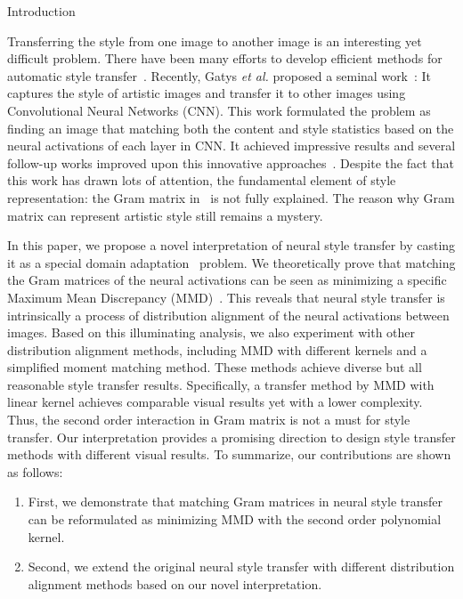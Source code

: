 \begin{section}{Introduction}

Transferring the style from one image to another image is an interesting yet difficult problem. There have been many efforts to develop efficient methods for automatic style transfer~\cite{hertzmann2001image,efros2001image,efros1999texture,shih2014style,kwatra2005texture}. Recently, Gatys \emph{et al.} proposed a seminal work~\cite{neuralart}: It captures the style of artistic images and transfer it to other images using Convolutional Neural Networks (CNN). This work formulated the problem as finding an image that matching both the content and style statistics based on the neural activations of each layer in CNN. It achieved impressive results and several follow-up works improved upon this innovative approaches~\cite{johnson2016perceptual,ulyanov2016texture,ruder2016artistic,ledig2016photo}. Despite the fact that this work has drawn lots of attention, the fundamental element of style representation: the Gram matrix in~\cite{neuralart} is not fully explained. The reason why Gram matrix can represent artistic style still remains a mystery.

In this paper, we propose a novel interpretation of neural style transfer by casting it as a special domain adaptation~\cite{beijbom2012domain,patel2015visual} problem. We theoretically prove that matching the Gram matrices of the neural activations can be seen as minimizing a specific Maximum Mean Discrepancy (MMD)~\cite{mmd}. This reveals that neural style transfer is intrinsically a process of distribution alignment of the neural activations between images. Based on this illuminating analysis, we also experiment with other distribution alignment methods, including MMD with different kernels and a simplified moment matching method. These methods achieve diverse but all reasonable style transfer results. Specifically, a transfer method by MMD with linear kernel achieves comparable visual results yet with a lower complexity. Thus, the second order interaction in Gram matrix is not a must for style transfer. Our interpretation provides a promising direction to design style transfer methods with different visual results. To summarize, our contributions are shown as follows:
\begin{enumerate}
\item First, we demonstrate that matching Gram matrices in neural style transfer~\cite{neuralart} can be reformulated as minimizing  MMD with the second order polynomial kernel.
\item Second, we extend the original neural style transfer with different distribution alignment methods based on our novel interpretation.
\end{enumerate}

\end{section}